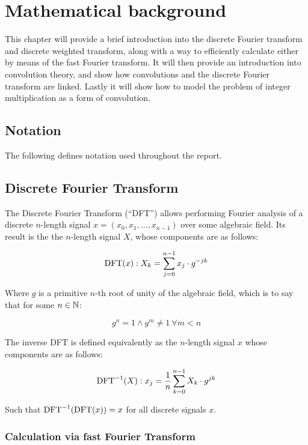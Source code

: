 \chapter{Mathematical background}
\label{chapter:mathematical_background}

This chapter will provide a brief introduction into the discrete Fourier
transform and discrete weighted transform, along with a way to efficiently
calculate either by means of the fast Fourier transform. It will then provide
an introduction into convolution theory, and show how convolutions and the
discrete Fourier transform are linked.
Lastly it will show how to model the problem of integer multiplication as a
form of convolution.

\section{Notation}

The following defines notation used throughout the report.

\section{Discrete Fourier Transform}

The Discrete Fourier Transform (``DFT'') allows performing Fourier analysis of
a discrete $n$-length signal $x = (x_0, x_1, \ldots, x_{n-1})$ over some
algebraic field. Its result is the the $n$-length signal $X$, whose components
are as follows:\autocite{crandallPrimeNumbersComputational2005}

\[
		\operatorname{DFT}(x) : X_k = \sum_{j=0}^{n-1} x_j \cdot g^{-jk}
\]

Where $g$ is a primitive $n$-th root of unity of the algebraic field, which is
to say that for some $n \in \mathbb{N}$:

\[
		g^n = 1 \land g^m \neq 1\ \forall m < n
\]

The inverse DFT is defined equivalently as the $n$-length signal $x$ whose
components are as follows:

\[
		\operatorname{DFT}^{-1}(X) : x_j = \frac{1}{n} \sum_{k=0}^{n-1} X_k \cdot g^{jk}
\]

Such that $\operatorname{DFT}^{-1}(\operatorname{DFT}(x)) = x$ for all discrete signals $x$.

\subsection{Calculation via fast Fourier Transform}

